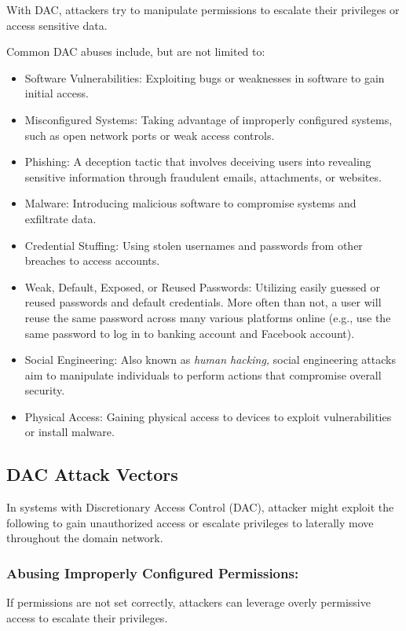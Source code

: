 With DAC, attackers try to manipulate permissions to escalate their privileges or access sensitive data.

Common DAC abuses include, but are not limited to:
\begin{itemize}
    \item Software Vulnerabilities: Exploiting bugs or weaknesses in software to gain initial access.
    \item Misconfigured Systems: Taking advantage of improperly configured systems, such as open network ports or weak access controls.
    \item Phishing: A deception tactic that involves deceiving users into revealing sensitive information through fraudulent emails, attachments, or websites.
    \item Malware: Introducing malicious software to compromise systems and exfiltrate data.
    \item Credential Stuffing: Using stolen usernames and passwords from other breaches to access accounts.
    \item Weak, Default, Exposed, or Reused Passwords: Utilizing easily guessed or reused passwords and default credentials. More often than not, a user will reuse the same password across many various platforms online (e.g., use the same password to log in to banking account and Facebook account).
    \item Social Engineering: Also known as \textit{human hacking,} social engineering attacks aim to manipulate individuals to perform actions that compromise overall security.
    \item Physical Access: Gaining physical access to devices to exploit vulnerabilities or install malware.
\end{itemize}

\subsection{DAC Attack Vectors}
In systems with Discretionary Access Control (DAC), attacker might exploit the following to gain unauthorized access or escalate privileges to laterally move throughout the domain network.

\subsubsection{Abusing Improperly Configured Permissions:}
If permissions are not set correctly, attackers can leverage overly permissive access to escalate their privileges.

